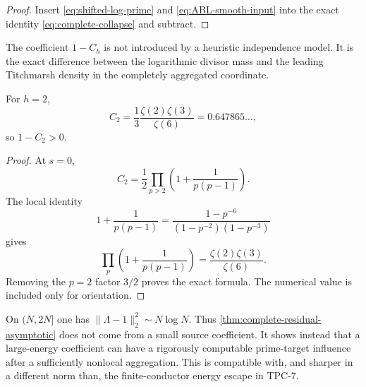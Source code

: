 \begin{proof}
Insert \eqref{eq:shifted-log-prime} and
\eqref{eq:ABL-smooth-input} into the exact identity
\eqref{eq:complete-collapse} and subtract.
\end{proof}

The coefficient $1-C_h$ is not introduced by a heuristic independence
model.  It is the exact difference between the logarithmic divisor mass and
the leading Titchmarsh density in the completely aggregated coordinate.

\begin{corollary}
\label{cor:h-two-constant}
For $h=2$,
\begin{equation}\label{eq:C2-zeta-value}
 C_2
 =\frac13\frac{\zeta(2)\zeta(3)}{\zeta(6)}
 =0.647865\ldots,
\end{equation}
so $1-C_2>0$.
\end{corollary}

\begin{proof}
At $s=0$,
\[
 C_2=\frac12\prod_{p>2}\left(1+\frac1{p(p-1)}\right).
\]
The local identity
\[
 1+\frac1{p(p-1)}
 =\frac{1-p^{-6}}{(1-p^{-2})(1-p^{-3})}
\]
gives
\[
 \prod_p\left(1+\frac1{p(p-1)}\right)
 =\frac{\zeta(2)\zeta(3)}{\zeta(6)}.
\]
Removing the $p=2$ factor $3/2$ proves the exact formula.  The numerical
value is included only for orientation.
\end{proof}

\begin{remark}
On $(N,2N]$ one has
$\|\Lambda-1\|_2^2\sim N\log N$.  Thus
\cref{thm:complete-residual-asymptotic} does not come from a small source
coefficient.  It shows instead that a large-energy coefficient can have a
rigorously computable prime-target influence after a sufficiently nonlocal
aggregation.  This is compatible with, and sharper in a different norm
than, the finite-conductor energy escape in TPC-7.
\end{remark}
